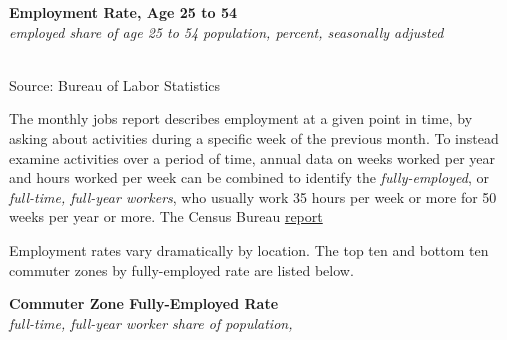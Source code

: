\documentclass{report}
\makeatletter
\newcommand{\tbllink}[1]{\href{https://raw.githubusercontent.com/bdecon/US-chartbook/master/chartbook/data/#1}{\faTable}}
\newcommand*\short[1]{\expandafter\@gobbletwo\number\numexpr#1\relax}
\newcommand{\dateaxisticks}{
		date coordinates in=x, axis line style={draw=none},
		xmax={2023-11-01},
		max space between ticks=40,	    
		xtick={{1990-01-01}, {1992-01-01}, {1994-01-01}, 
			{1996-01-01}, {1998-01-01}, {2000-01-01}, 
			{2002-01-01}, {2004-01-01}, {2006-01-01},
			{2008-01-01}, {2010-01-01}, {2012-01-01}, {2014-01-01},
		    {2016-01-01}, {2018-01-01}, {2020-01-01}, {2022-01-01}, 
		    {2024-01-01}, {2026-01-01}},
		minor xtick={{1989-01-01}, {1991-01-01}, {1993-01-01},
			{1995-01-01}, {1997-01-01}, {1999-01-01}, 
			{2001-01-01}, {2003-01-01}, {2005-01-01}, {2007-01-01},
		    {2009-01-01}, {2011-01-01}, {2013-01-01}, {2015-01-01},
		    {2017-01-01}, {2019-01-01}, {2021-01-01}, {2023-01-01}, 
		    {2025-01-01}, {2027-01-01}},
		enlarge y limits={0.06}, enlarge x limits={0.01},
		}
\newcommand{\stdline}[4]{\addplot[very thick, no markers, color=#1] 
		table [x=#2, y=#3, col sep=comma] {#4};	}
\newcommand{\rbars}{
		\fill[color=black!10] (axis cs:{1990-07-01},\pgfkeysvalueof{/pgfplots/ymin}) rectangle 
			(axis cs:{1991-03-01}, \pgfkeysvalueof{/pgfplots/ymax});
		\fill[color=black!10] (axis cs:{2007-12-01},\pgfkeysvalueof{/pgfplots/ymin}) rectangle 
			(axis cs:{2009-07-01}, \pgfkeysvalueof{/pgfplots/ymax});
		\fill[color=black!10] (axis cs:{2001-03-01},\pgfkeysvalueof{/pgfplots/ymin}) rectangle 
			(axis cs:{2001-11-01}, \pgfkeysvalueof{/pgfplots/ymax});
		\fill[color=black!10] (axis cs:{2020-02-01},\pgfkeysvalueof{/pgfplots/ymin}) rectangle 
			(axis cs:{2020-05-01}, \pgfkeysvalueof{/pgfplots/ymax});}
\makeatother
\begin{document}
{\begin{minipage}{0.76\textwidth}
\normalsize \textbf{Employment Rate, Age 25 to 54}\\
\footnotesize{\textit{employed share of age 25 to 54 population, percent, seasonally adjusted}}\\
\hspace*{-1mm} \\
\footnotesize{Source: Bureau of Labor Statistics} \hfill \tbllink{epop.csv}
\end{minipage}
\newpage
\begin{minipage}{0.76\textwidth} 
\small The monthly jobs report describes employment at a given point in time, by asking about activities during a specific week of the previous month. To instead examine activities over a period of time, annual data on weeks worked per year and hours worked per week can be combined to identify the \textit{fully-employed}, or \textit{full-time, full-year workers}, who usually work 35 hours per week or more for 50 weeks per year or more. The Census Bureau \href{https://www.census.gov/data/tables/time-series/demo/income-poverty/cps-pinc/pinc-01.html#par_textimage_14}{report} 

Employment rates vary dramatically by location. The top ten and bottom ten commuter zones by fully-employed rate are listed below.
\end{minipage}
\vspace{1mm}

\begin{minipage}{0.55\textwidth}
\normalsize \textbf{Commuter Zone Fully-Employed Rate}\\
\footnotesize{\textit{full-time, full-year worker share of population, }}\\
\vspace*{-6mm}

\hspace{-11mm} 


\end{minipage}}
\end{document}
